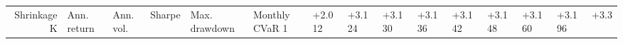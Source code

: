 \begin{tabular}{rlllllll}
\toprule
Shrinkage K & Ann. return & Ann. vol. & Sharpe & Max. drawdown & Monthly CVaR 1%
 & +2.0%
12 & +3.1%
24 & +3.1%
30 & +3.1%
36 & +3.1%
42 & +3.1%
48 & +3.1%
60 & +3.1%
96 & +3.3%
\bottomrule
\end{tabular}
